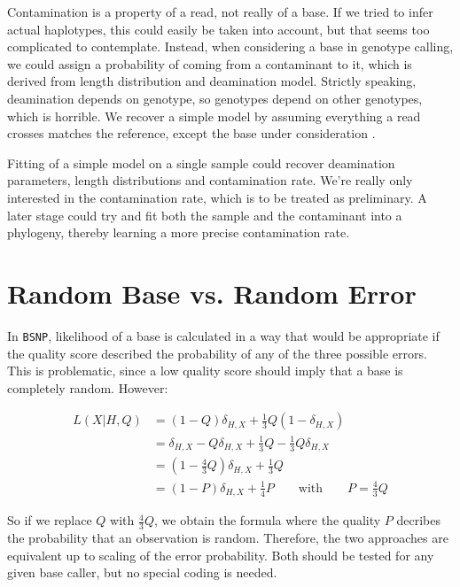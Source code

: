 \documentclass{article}
\begin{document}
Contamination is a property of a read, not really of a base.  If we
tried to infer actual haplotypes, this could easily be taken into
account, but that seems too complicated to contemplate.  Instead, when
considering a base in genotype calling, we could assign a probability of
coming from a contaminant to it, which is derived from length
distribution and deamination model.  Strictly speaking, deamination
depends on genotype, so genotypes depend on other genotypes, which is
horrible.  We recover a simple model by assuming everything a read
crosses matches the reference, except the base under consideration
.

Fitting of a simple model on a single sample could recover deamination
parameters, length distributions and contamination rate.  We're really
only interested in the contamination rate, which is to be treated as
preliminary.  A later stage could try and fit both the sample and the
contaminant into a phylogeny, thereby learning a more precise
contamination rate.

\appendix

\section{Random Base vs. Random Error}
\label{app_errprob}

In \texttt{BSNP}, likelihood of a base is calculated in a way that would be appropriate if the quality score described the
probability of any of the three possible errors.  This is problematic, since a low quality score should imply that a base is
completely random.  However:

\begin{align*}
L(X|H,Q) &= (1-Q)\delta_{H,X} + \frac{1}{3} Q (1-\delta_{H,X}) \\
&= \delta_{H,X} - Q\delta_{H,X} + \frac{1}{3}Q - \frac{1}{3}Q\delta_{H,X} \\
&= (1-\frac{4}{3}Q)\delta_{H,X} + \frac{1}{3}Q \\
&= (1-P) \delta_{H,X} + \frac{1}{4}P \qquad \mbox{with} \qquad P=\frac{4}{3}Q
\end{align*}

So if we replace $Q$ with $\frac{4}{3}Q$, we obtain the formula where the quality $P$ decribes the probability that an observation
is random.  Therefore, the two approaches are equivalent up to scaling of the error probability.  Both should be tested for any
given base caller, but no special coding is needed.
\end{document}
